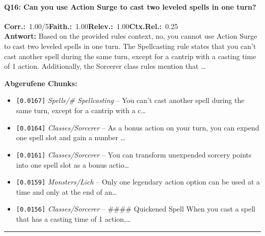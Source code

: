 \paragraph{Q16: Can you use Action Surge to cast two leveled spells in one turn?}
\noindent \textbf{Corr.:}~1.00/5\quad \textbf{Faith.:}~1.00\quad \textbf{Relev.:}~1.00\quad \textbf{Ctx.Rel.:}~0.25\\

\noindent\textbf{Antwort:} Based on the provided rules context, no, you cannot use Action Surge to cast two leveled spells in one turn. The Spellcasting rule states that you can't cast another spell during the same turn, except for a cantrip with a casting time of 1 action. Additionally, the Sorcerer class rules mention that \ldots

\noindent\textbf{Abgerufene Chunks:}
\begin{itemize}[noitemsep, topsep=2pt]
  \item[\textbf{\#1}] \texttt{[0.0167]} \textit{Spells/# Spellcasting} -- You can't cast another spell during the same turn, except for a cantrip with a c\ldots
  \item[\textbf{\#2}] \texttt{[0.0164]} \textit{Classes/Sorcerer} -- As a bonus action on your turn, you can expend one spell slot and gain a number \ldots
  \item[\textbf{\#3}] \texttt{[0.0161]} \textit{Classes/Sorcerer} -- You can transform unexpended sorcery points into one spell slot as a bonus actio\ldots
  \item[\textbf{\#4}] \texttt{[0.0159]} \textit{Monsters/Lich} -- Only one legendary action option can be used at a time and only at the end of an\ldots
  \item[\textbf{\#5}] \texttt{[0.0156]} \textit{Classes/Sorcerer} -- \#\#\#\# Quickened Spell  When you cast a spell that has a casting time of 1 action,\ldots
\end{itemize}
\vspace{4pt}
\hrule
\vspace{6pt}
